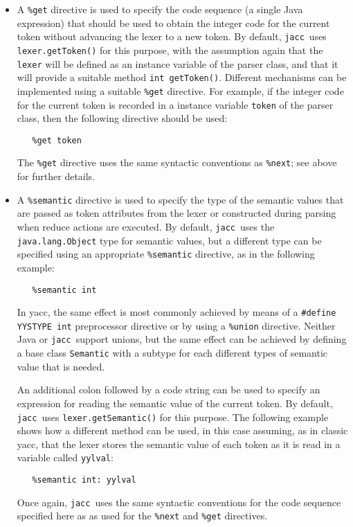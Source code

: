 \documentclass[12pt]{article}
\def\jacc{{\tt jacc}}
\begin{document}
\begin{itemize}
\item A \verb"%get" directive is used to specify the code
      sequence (a single Java expression) that should be used to
      obtain the integer code for the current token without
      advancing the lexer to a new token.  By default, \jacc\ uses
      \verb"lexer.getToken()" for this purpose, with the assumption
      again that the \verb"lexer" will be defined as an instance
      variable of the parser class, and that it will provide a
      suitable method \verb"int getToken()".   Different mechanisms
      can be implemented using a suitable \verb"%get" directive.
      For example, if the integer code for the current token is
      recorded in a instance variable \verb"token" of the parser
      class, then the following directive should be used:
\begin{verbatim}
   %get token
\end{verbatim}
      The \verb"%get" directive uses the same syntactic conventions
      as \verb"%next"; see above for further details.

\item A \verb"%semantic" directive is used to specify the type of
      the semantic values that are passed as token attributes from
      the lexer or constructed during parsing when reduce actions
      are executed.  By default, \jacc\ uses the \verb"java.lang.Object"
      type for semantic values, but a different type can be specified
      using an appropriate \verb"%semantic" directive, as in the
      following example:
\begin{verbatim}
   %semantic int
\end{verbatim}
       In yacc, the same effect is most commonly achieved by
       means of a \verb"#define YYSTYPE int" preprocessor directive
       or by using a \verb"%union" directive.  Neither Java or
       \jacc\ support unions, but the same effect can be achieved by
       defining a base class \verb"Semantic" with a subtype for each
       different types of semantic value that is needed.

       An additional colon followed by a code string can be used to
       specify an expression for reading the semantic value of the
       current token.  By default, \jacc\ uses \verb"lexer.getSemantic()"
       for this purpose.  The following example shows how a different
       method can be used, in this case assuming, as in classic yacc,
       that the lexer stores the semantic value of each token as it
       is read in a variable called \verb"yylval":
\begin{verbatim}
   %semantic int: yylval
\end{verbatim}
       Once again, \jacc\ uses the same syntactic conventions
       for the code sequence specified here as as used for
       the \verb"%next" and \verb"%get" directives.
\end{itemize}
\end{document}
